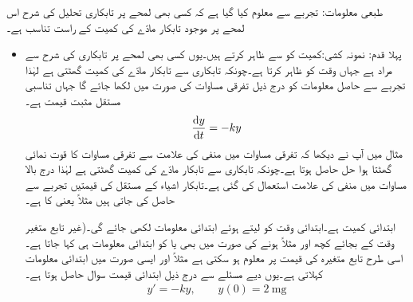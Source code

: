 طبعی معلومات: تجربے سے معلوم کیا گیا ہے کہ کسی بھی لمحے پر تابکاری تحلیل کی شرح اس لمحے پر موجود تابکار مادّے کی کمیت کے راست تناسب ہے۔ 
\begin{itemize}
\item[(الف)]
پہلا قدم: نمونہ کشی:\quad کمیت کو  سے ظاہر کرتے ہیں۔یوں کسی بھی لمحے پر تابکاری کی شرح سے مراد  ہے جہاں  وقت کو ظاہر کرتا ہے۔چونکہ تابکاری سے تابکار مادّے کی کمیت گھٹتی ہے لہٰذا تجربے سے حاصل معلومات کو درج ذیل تفرقی مساوات کی صورت میں لکھا جائے گا جہاں تناسبی مستقل  مثبت قیمت ہے۔
\begin{align}
\frac{\dif y}{\dif t}=-ky
\end{align}
مثال  میں آپ نے دیکھا کہ تفرقی مساوات میں منفی کی علامت سے تفرقی مساوات کا قوت نمائی گھٹتا ہوا حل حاصل ہوتا ہے۔چونکہ تابکاری سے تابکار مادّے کی کمیت گھٹتی ہے لہٰذا درج بالا مساوات میں منفی کی علامت استعمال کی گئی ہے۔تابکار اشیاء کے مستقل  کی قیمتیں تجربے سے حاصل کی جاتی ہیں مثلاً  یعنی    کا  ہے۔

ابتدائی کمیت  ہے۔ابتدائی وقت کو  لیتے  ہوئے ابتدائی معلومات  لکھی  جائے گی۔(غیر تابع متغیر وقت  کے بجائے  کچھ اور مثلاً  ہونے کی صورت میں بھی  یا  کو ابتدائی معلومات ہی کہا جاتا ہے۔اسی طرح تابع متغیرہ  کی قیمت  پر معلوم ہو سکتی ہے مثلاً  اور ایسی صورت میں  ابتدائی معلومات کہلاتی ہے۔یوں دیے مسئلے سے درج ذیل ابتدائی قیمت سوال حاصل ہوتا ہے۔
\begin{align}
y'=-ky,\quad \quad y(0)=\SI{2}{\milli\gram} 
\end{align}


\end{itemize}
